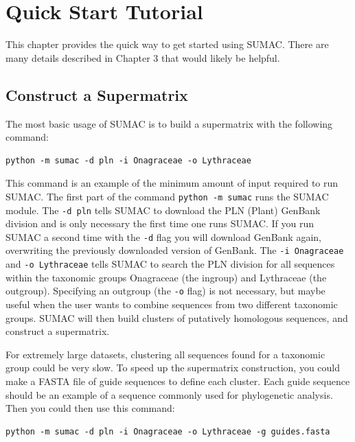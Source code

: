 \documentclass[10pt]{report}
\begin{document}

\chapter{Quick Start Tutorial}

This chapter provides the quick way to get started using SUMAC. 
There are many details described in Chapter 3 that
would likely be helpful.

\section{Construct a Supermatrix}

The most basic usage of SUMAC is to build a supermatrix with the following
command:

\begin{verbatim}
python -m sumac -d pln -i Onagraceae -o Lythraceae
\end{verbatim}

This command is an example of the minimum amount of input required
to run SUMAC. The first part of the command \texttt{python -m sumac}
runs the SUMAC module. The \texttt{-d pln}
tells SUMAC to download the PLN (Plant) GenBank division and is only necessary the first time one runs SUMAC. 
If you run SUMAC a second time with the \texttt{-d} flag you will download 
GenBank again, overwriting the previously downloaded version of GenBank.
The \texttt{-i Onagraceae} and \texttt{-o Lythraceae}
tells SUMAC to search the PLN division for all sequences within
the taxonomic groups Onagraceae (the ingroup) and Lythraceae (the outgroup).
Specifying an outgroup (the \texttt{-o} flag) is not necessary, 
but maybe useful when the user wants to combine sequences from two
different taxonomic groups.
SUMAC will then
build clusters of putatively homologous sequences, and 
construct a supermatrix. 

For extremely large datasets, clustering all sequences found
for a taxonomic group could be very slow.
To speed up the supermatrix construction, you could make a FASTA file
of guide sequences to define each cluster. Each guide
sequence should be an example of a sequence commonly used for phylogenetic
analysis. Then you could then use this command:

\begin{verbatim}
python -m sumac -d pln -i Onagraceae -o Lythraceae -g guides.fasta
\end{verbatim}
\end{document}
